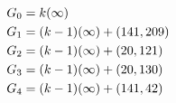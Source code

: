 \documentclass[preview]{standalone}
\begin{document}
\begin{align*}
\special{dvisvgm:raw <g id='unique000'>}G_0&=k(\infty) \\ G_1&=(k-1)(\infty)+(141,209) \\ G_2&=(k-1)(\infty)+(20,121) \\ G_3&=(k-1)(\infty)+(20,130) \\ G_4&=(k-1)(\infty)+(141,42)\special{dvisvgm:raw </g>}
\end{align*}
\end{document}
